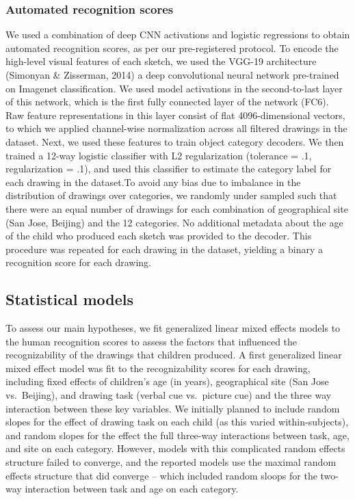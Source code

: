 \documentclass[
  english,
  man]{apa6}
\begin{document}
\hypertarget{automated-recognition-scores}{%
\subsubsection{Automated recognition scores}\label{automated-recognition-scores}}

We used a combination of deep CNN activations and logistic regressions to obtain automated recognition scores, as per our pre-registered protocol. To encode the high-level visual features of each sketch, we used the VGG-19 architecture (Simonyan \& Zisserman, 2014) a deep convolutional neural network pre-trained on Imagenet classification. We used model activations in the second-to-last layer of this network, which is the first fully connected layer of the network (FC6). Raw feature representations in this layer consist of flat 4096-dimensional vectors, to which we applied channel-wise normalization across all filtered drawings in the dataset. Next, we used these features to train object category decoders. We then trained a 12-way logistic classifier with L2 regularization (tolerance = .1, regularization = .1), and used this classifier to estimate the category label for each drawing in the dataset.To avoid any bias due to imbalance in the distribution of drawings over categories, we randomly under sampled such that there were an equal number of drawings for each combination of geographical site (San Jose, Beijing) and the 12 categories. No additional metadata about the age of the child who produced each sketch was provided to the decoder. This procedure was repeated for each drawing in the dataset, yielding a binary a recognition score for each drawing.

\hypertarget{statistical-models}{%
\subsection{Statistical models}\label{statistical-models}}

To assess our main hypotheses, we fit generalized linear mixed effects models to the human recognition scores to assess the factors that influenced the recognizability of the drawings that children produced. A first generalized linear mixed effect model was fit to the recognizability scores for each drawing, including fixed effects of children's age (in years), geographical site (San Jose vs.~Beijing), and drawing task (verbal cue vs.~picture cue) and the three way interaction between these key variables. We initially planned to include random slopes for the effect of drawing task on each child (as this varied within-subjects), and random slopes for the effect the full three-way interactions between task, age, and site on each category. However, models with this complicated random effects structure failed to converge, and the reported models use the maximal random effects structure that did converge -- which included random sloops for the two-way interaction between task and age on each category.
\end{document}
